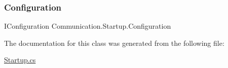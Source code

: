 \subsubsection{\texorpdfstring{Configuration}{Configuration}}
{\footnotesize\ttfamily I\+Configuration Communication.\+Startup.\+Configuration\hspace{0.3cm}{\ttfamily [get]}}



The documentation for this class was generated from the following file\+:\begin{DoxyCompactItemize}
\item 
\mbox{\hyperlink{_startup_8cs}{Startup.\+cs}}\end{DoxyCompactItemize}
